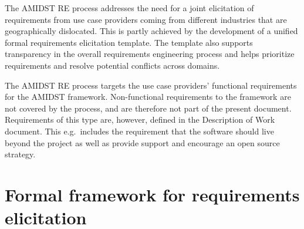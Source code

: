 \documentclass[11pt, oneside]{article}   	%
\begin{document}
The AMIDST RE process addresses the need for a joint elicitation of requirements from use case providers coming from
different industries that are geographically dislocated. This is partly achieved by the development of a 
unified formal requirements elicitation template. The template also supports transparency in the overall
requirements engineering process and helps prioritize requirements and resolve potential conflicts across domains.  

The AMIDST RE process targets the use case providers' functional requirements for the AMIDST framework. Non-functional requirements to the framework are not covered by the process,
and are therefore not part of the present document. Requirements of this type are, however, defined in the Description
of Work document. This e.g.\ includes the requirement that the software should live beyond the project as well as
provide support and
encourage an open source strategy.


\newpage














\appendix


\section{Formal framework for requirements elicitation}
\label{sec:form-fram-requ}


\end{document}
